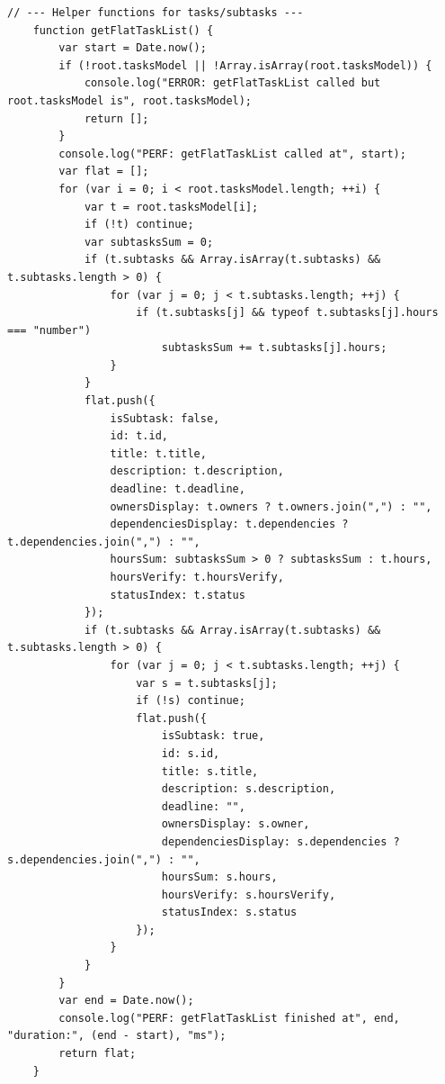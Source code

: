 \documentclass{report}
\begin{document}
\begin{lstlisting}[style=qmlstyle]
    // --- Helper functions for tasks/subtasks ---
    function getFlatTaskList() {
        var start = Date.now();
        if (!root.tasksModel || !Array.isArray(root.tasksModel)) {
            console.log("ERROR: getFlatTaskList called but root.tasksModel is", root.tasksModel);
            return [];
        }
        console.log("PERF: getFlatTaskList called at", start);
        var flat = [];
        for (var i = 0; i < root.tasksModel.length; ++i) {
            var t = root.tasksModel[i];
            if (!t) continue;
            var subtasksSum = 0;
            if (t.subtasks && Array.isArray(t.subtasks) && t.subtasks.length > 0) {
                for (var j = 0; j < t.subtasks.length; ++j) {
                    if (t.subtasks[j] && typeof t.subtasks[j].hours === "number")
                        subtasksSum += t.subtasks[j].hours;
                }
            }
            flat.push({
                isSubtask: false,
                id: t.id,
                title: t.title,
                description: t.description,
                deadline: t.deadline,
                ownersDisplay: t.owners ? t.owners.join(",") : "",
                dependenciesDisplay: t.dependencies ? t.dependencies.join(",") : "",
                hoursSum: subtasksSum > 0 ? subtasksSum : t.hours,
                hoursVerify: t.hoursVerify,
                statusIndex: t.status
            });
            if (t.subtasks && Array.isArray(t.subtasks) && t.subtasks.length > 0) {
                for (var j = 0; j < t.subtasks.length; ++j) {
                    var s = t.subtasks[j];
                    if (!s) continue;
                    flat.push({
                        isSubtask: true,
                        id: s.id,
                        title: s.title,
                        description: s.description,
                        deadline: "",
                        ownersDisplay: s.owner,
                        dependenciesDisplay: s.dependencies ? s.dependencies.join(",") : "",
                        hoursSum: s.hours,
                        hoursVerify: s.hoursVerify,
                        statusIndex: s.status
                    });
                }
            }
        }
        var end = Date.now();
        console.log("PERF: getFlatTaskList finished at", end, "duration:", (end - start), "ms");
        return flat;
    }


\end{lstlisting}
\end{document}
